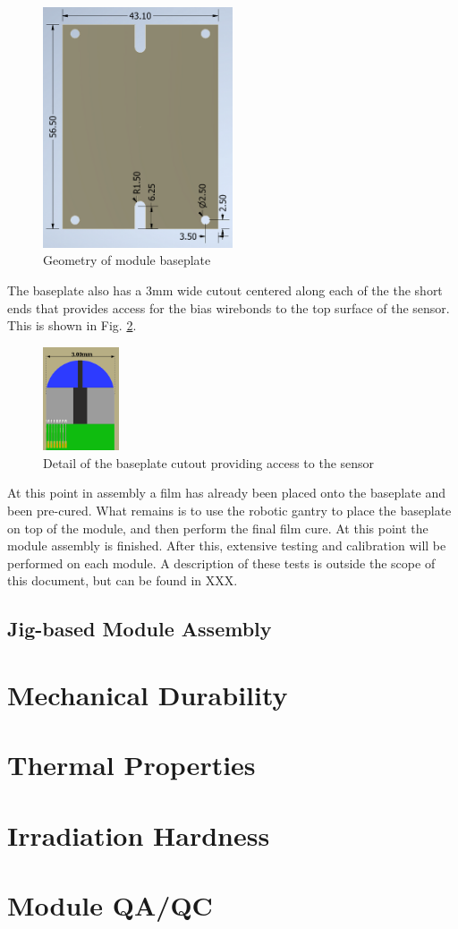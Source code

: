 \documentclass[10pt]{datasheet}
\begin{document}
\begin{figure}[h]
	\centering
	\includegraphics[width=0.5\textwidth,angle=-90]{figures/baseplate.png}
	\caption{Geometry of module baseplate}
	\label{fig:baseplate}	
\end{figure}

The baseplate also has a 3mm wide cutout centered along each of the the short ends that provides access for the bias wirebonds to the top surface of the sensor. This is shown in Fig. \ref{fig:baseplate-detail}.

\begin{figure}[h]
	\centering
	\includegraphics[width=0.2\textwidth]{figures/baseplate-detail.png}
	\caption{Detail of the baseplate cutout providing access to the sensor}
	\label{fig:baseplate-detail}	
\end{figure}

At this point in assembly a film has already been placed onto the baseplate and been pre-cured. What remains is to use the robotic gantry to place the baseplate on top of the module, and then perform the final film cure. At this point the module assembly is finished. After this, extensive testing and calibration will be performed on each module. A description of these tests is outside the scope of this document, but can be found in XXX.

\subsection{Jig-based Module Assembly}

\section{Mechanical Durability}


\section{Thermal Properties}


\section{Irradiation Hardness}


\section{Module QA/QC}
\end{document}
